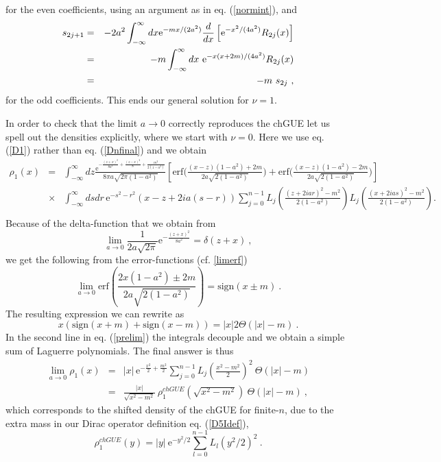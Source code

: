 \documentclass[11pt]{article}
\newcommand{\be}{\begin{equation}}
\newcommand{\ee}{\end{equation}}
\newcommand{\bea}{\begin{eqnarray}}
\newcommand{\eea}{\end{eqnarray}}
\newcommand{\nn}{\nonumber}
\newcommand{\e}{\mbox{e}}
\newcommand{\erf}{\mbox{erf}}
\newcommand{\sign}{\mbox{sign}}
\begin{document}
for the even coefficients, using an argument as in eq. (\ref{normint}), and
\begin{eqnarray}
s_{2 j + 1} & = & - 2 a^2 \int_{-\infty}^{\infty} dx {\rm e}^{- m x/(2 a^2)} 
\frac{d}{dx}\left[ {\rm e}^{-x^2/(4 a^2)} R_{2 j}(x) \right] \nonumber \\ 
& = & - m \int_{-\infty}^{\infty} dx \ 
{\rm e}^{-x(x + 2 m)/(4 a^2)} R_{2 j}(x) \nonumber \\ 
& = & - m \ s_{2 j}\ ,
\end{eqnarray}
for the odd coefficients. This ends our general solution for $\nu=1$.



In order to check that the limit $a\to0$ correctly reproduces the
chGUE let us spell out the densities explicitly, where we start with
$\nu=0$. Here we use 
eq. (\ref{D1}) rather than eq. (\ref{Dnfinal}) and we obtain
\bea
\rho_1(x)&=&\int_{-\infty}^\infty dz
\frac{\e^{-\frac{(z+x)^2}{8a^2}+\frac{(z-x)^2}{8}+\frac{m^2}{2(1-a^2)}}}{8\pi
  a\sqrt{2\pi(1-a^2)}} 
\left[\erf\Big(
\frac{(x-z)(1-a^2)+2m}{2a\sqrt{2(1-a^2)}}
\Big)
+
\erf\Big(
\frac{(x-z)(1-a^2)-2m}{2a\sqrt{2(1-a^2)}}
\Big)
\right]\nn\\
&\times&\int_{-\infty}^\infty dsdr\, \e^{-s^2-r^2}(x-z+2ia(s-r))
\sum_{j=0}^{n-1}L_j\left( \frac{(z+2iar)^2-m^2}{2(1-a^2)}\right)
L_j\left(\frac{(x+2ias)^2-m^2}{2(1-a^2)}\right).\nn\\
&&
\label{prelim}
\eea 
Because of the delta-function that we obtain from 
\be
\lim_{a\to0}\frac{1}{2a\sqrt{2\pi}}\e^{-\frac{(z+x)^2}{8a^2}}=\delta(z+x)\ ,
\ee
we get the following from the error-functions (cf. \ref{limerf})
\be
\lim_{a\to0}\erf\left(
\frac{2x(1-a^2)\pm2m}{2a\sqrt{2(1-a^2)}}\right)=\sign(x\pm m)\ .
\ee
The resulting expression we can rewrite as 
\be
x(\sign(x+m)+\sign(x-m))=|x|2\Theta(|x|-m)\ .
\ee
In the second line in eq. (\ref{prelim}) the integrals decouple and we
obtain a simple sum of Laguerre polynomials. The final answer is thus 
\bea
\lim_{a\to0}\rho_1(x)&=& |x|\,\e^{-\frac{x^2}{2}+\frac{m^2}{2}}
\sum_{j=0}^{n-1}L_j\left(\frac{x^2-m^2}{2}\right)^2\ 
\Theta(|x|-m)
\label{rhonu0lim}\\
&=&\frac{|x|}{\sqrt{x^2-m^2}}\
\rho_1^{chGU\!E}\left(\sqrt{x^2-m^2}\right)\ 
\Theta(|x|-m)\ ,
\label{shift}
\eea
which corresponds to the shifted density of the chGUE for finite-$n$, due to the
extra mass in our Dirac operator definition eq. (\ref{D5Idef}),
\be
\rho_1^{chGU\!E}(y)= |y|\ \e^{-y^2/2}\sum_{l=0}^{n-1}L_l(y^2/2)^2\ .
\label{rhochGUE}
\ee
\end{document}
